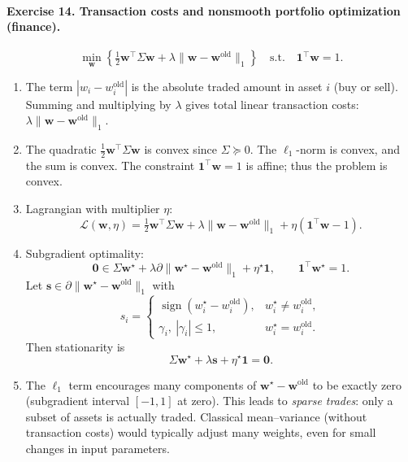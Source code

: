 \documentclass[11pt]{article}
\begin{document}
\paragraph{Exercise 14. Transaction costs and nonsmooth portfolio optimization (finance).}

\[
\min_{\bm{w}}
\left\{
\tfrac12\bm{w}^\top\Sigma\bm{w}
+ \lambda\|\bm{w}-\bm{w}^{\mathrm{old}}\|_1
\right\}
\quad\text{s.t.}\quad
\bm{1}^\top\bm{w}=1.
\]

\begin{enumerate}
\item The term $|w_i-w_i^{\mathrm{old}}|$ is the absolute traded amount in asset $i$ (buy or sell).  
Summing and multiplying by $\lambda$ gives total linear transaction costs: $\lambda\|\bm{w}-\bm{w}^{\mathrm{old}}\|_1$.

\item The quadratic $\tfrac12\bm{w}^\top\Sigma\bm{w}$ is convex since $\Sigma\succeq 0$.  
The $\ell_1$-norm is convex, and the sum is convex.  
The constraint $\bm{1}^\top\bm{w}=1$ is affine; thus the problem is convex.

\item Lagrangian with multiplier $\eta$:
\[
\mathcal{L}(\bm{w},\eta)
=
\tfrac12\bm{w}^\top\Sigma\bm{w}
+ \lambda\|\bm{w}-\bm{w}^{\mathrm{old}}\|_1
+ \eta(\bm{1}^\top\bm{w}-1).
\]

\item Subgradient optimality:
\[
\bm{0}
\in
\Sigma\bm{w}^\star
+ \lambda\partial\|\bm{w}^\star-\bm{w}^{\mathrm{old}}\|_1
+ \eta^\star\bm{1},
\qquad
\bm{1}^\top\bm{w}^\star=1.
\]
Let $\bm{s}\in\partial\|\bm{w}^\star-\bm{w}^{\mathrm{old}}\|_1$ with
\[
s_i =
\begin{cases}
\operatorname{sign}(w_i^\star-w_i^{\mathrm{old}}), & w_i^\star\neq w_i^{\mathrm{old}},\\
\gamma_i,\ |\gamma_i|\le1, & w_i^\star = w_i^{\mathrm{old}}.
\end{cases}
\]
Then stationarity is
\[
\Sigma\bm{w}^\star + \lambda\bm{s} + \eta^\star\bm{1} = \bm{0}.
\]

\item The $\ell_1$ term encourages many components of $\bm{w}^\star-\bm{w}^{\mathrm{old}}$ to be exactly zero (subgradient interval $[-1,1]$ at zero).  
This leads to \emph{sparse trades}: only a subset of assets is actually traded.  
Classical mean–variance (without transaction costs) would typically adjust many weights, even for small changes in input parameters.
\end{enumerate}
\end{document}
